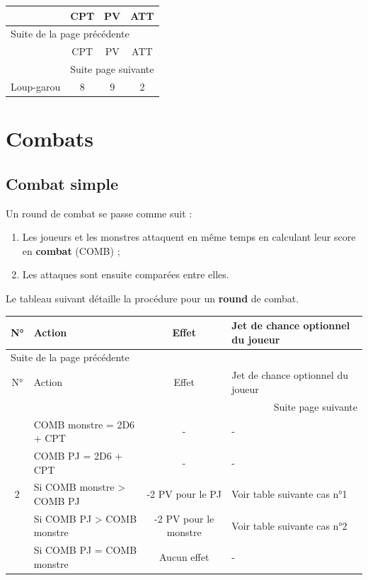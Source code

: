 \documentclass[a4paper, 11pt, twoside]{article}
\begin{document}
\begin{longtable}{l|c|c|c}
 & CPT & PV & ATT\\
\hline
\endfirsthead
\multicolumn{4}{l}{Suite de la page précédente} \\
\hline

 & CPT & PV & ATT \\

\hline
\endhead
\hline\multicolumn{4}{r}{Suite page suivante} \\
\endfoot
\endlastfoot
\hline
Loup-garou & 8 & 9 & 2\\
\end{longtable}

\section{Combats}
\label{sec:org8f62093}

\subsection{Combat simple}
\label{sec:org2cb948f}

Un round de combat se passe comme suit :
\begin{enumerate}
\item Les joueurs et les monstres attaquent en même temps en calculant leur score en \textbf{combat} (COMB) ;
\item Les attaques sont ensuite comparées entre elles.
\end{enumerate}

Le tableau suivant détaille la procédure pour un \textbf{round} de combat.

\begin{longtable}{c|l|c|l}
N° & Action & Effet & Jet de chance optionnel du joueur\\
\hline
\endfirsthead
\multicolumn{4}{l}{Suite de la page précédente} \\
\hline

N° & Action & Effet & Jet de chance optionnel du joueur \\

\hline
\endhead
\hline\multicolumn{4}{r}{Suite page suivante} \\
\endfoot
\endlastfoot
\hline
1 & COMB monstre = 2D6 + CPT & - & -\\
 & COMB PJ = 2D6 + CPT & - & -\\
\hline
2 & Si COMB monstre > COMB PJ & -2 PV pour le PJ & Voir table suivante cas n°1\\
 & Si COMB PJ > COMB monstre & -2 PV pour le monstre & Voir table suivante cas n°2\\
 & Si COMB PJ = COMB monstre & Aucun effet & -\\
\end{longtable}
\end{document}
